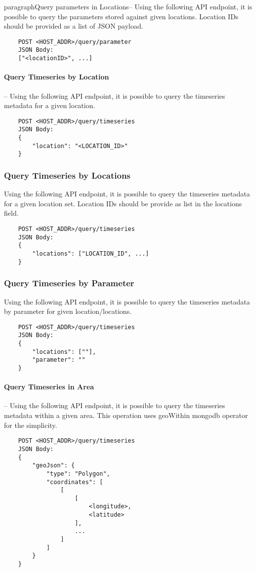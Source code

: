 paragraph{Query parameters in Locations}-- Using the following API endpoint, it is possible to query the parameters stored against given locations. Location IDs should be provided as a list of JSON payload.
\begin{lstlisting}
    POST <HOST_ADDR>/query/parameter
    JSON Body:
    ["<locationID>", ...]
\end{lstlisting}

\paragraph{Query Timeseries by Location}-- Using the following API endpoint, it is possible to query the timeseries metadata for a given location.
\begin{lstlisting}
    POST <HOST_ADDR>/query/timeseries
    JSON Body:
    {
        "location": "<LOCATION_ID>"
    }
\end{lstlisting}

\subsubsection{Query Timeseries by Locations}
Using the following API endpoint, it is possible to query the timeseries metadata for a given location set. Location IDs should be provide as list in the locations field.
\begin{lstlisting}
    POST <HOST_ADDR>/query/timeseries
    JSON Body:
    {
        "locations": ["LOCATION_ID", ...]
    }
\end{lstlisting}

\subsubsection{Query Timeseries by Parameter}
Using the following API endpoint, it is possible to query the timeseries metadata by parameter for given location/locations.
\begin{lstlisting}
    POST <HOST_ADDR>/query/timeseries
    JSON Body:
    {
        "locations": [""],
        "parameter": ""
    }
\end{lstlisting}

\paragraph{Query Timeseries in Area} -- Using the following API endpoint, it is possible to query the timeseries metadata within a given area. This operation uses geoWithin \acrshort{mongodb} operator for the simplicity.
\begin{lstlisting}
    POST <HOST_ADDR>/query/timeseries
    JSON Body:
    {
        "geoJson": {
            "type": "Polygon",
            "coordinates": [
                [
                    [
                        <longitude>,
                        <latitude>
                    ],
                    ...
                ]
            ]
        }
    }
\end{lstlisting}

